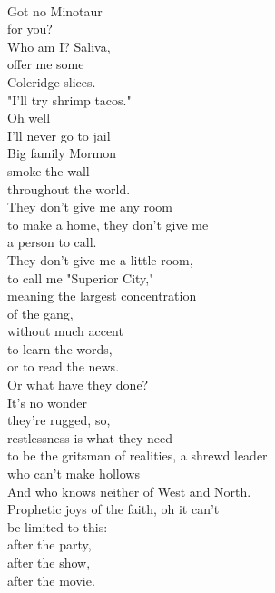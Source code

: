 \documentclass[smalldemyvopaper,11pt,twoside,onecolumn,openright,extrafontsizes]{memoir}
\begin{document}
\\Got no Minotaur
\\for you?
\\Who am I? Saliva,
\\offer me some
\\Coleridge slices.
\\"I'll try shrimp tacos."
\\Oh well
\\I'll never go to jail
\\Big family Mormon
\\smoke the wall
\\throughout the world.
\\They don't give me any room
\\to make a home, they don't give me
\\a person to call.
\\They don't give me a little room,
\\to call me "Superior City,"
\\meaning the largest concentration
\\of the gang,
\\without much accent
\\to learn the words,
\\or to read the news.
\\Or what have they done?
\\It's no wonder
\\they're rugged, so,
\\restlessness is what they need--
\\to be the gritsman of realities, a shrewd leader
\\who can't make hollows
\\And who knows neither of West and North.
\\Prophetic joys of the faith, oh it can't
\\be limited to this:
\\after the party,
\\after the show,
\\after the movie.
\end{document}
